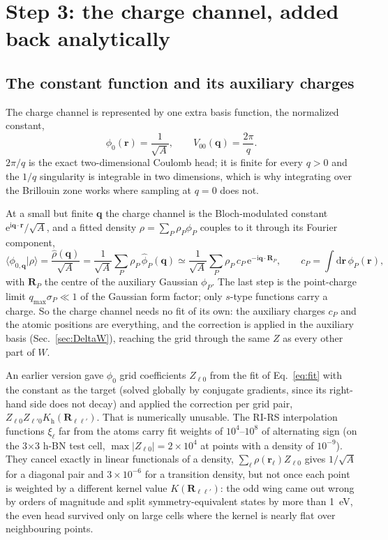 \documentclass[11pt,a4paper]{article}
\newcommand{\br}{\mathbf{r}}
\newcommand{\bR}{\mathbf{R}}
\newcommand{\bq}{\mathbf{q}}
\newcommand{\dd}{\mathrm{d}}
\newcommand{\ii}{\mathrm{i}}
\newcommand{\ee}{\mathrm{e}}
\newcommand{\head}{\mathrm{h}}
\begin{document}
\section{Step 3: the charge channel, added back analytically}
\label{sec:charge}

\subsection{The constant function and its auxiliary charges}
\label{sec:Zl0}

The charge channel is represented by one extra basis function, the normalized constant,
\begin{equation}
  \phi_0(\br) = \frac{1}{\sqrt A},\qquad V_{00}(\bq) = \frac{2\pi}{q}.
  \label{eq:phi0}
\end{equation}
$2\pi/q$ is the exact two-dimensional Coulomb head; it is finite for every $q>0$ and the
$1/q$ singularity is integrable in two dimensions, which is why integrating over the Brillouin
zone works where sampling at $q=0$ does not.

At a small but finite $\bq$ the charge channel is the Bloch-modulated constant
$\ee^{\ii\bq\cdot\br}/\sqrt A$, and a fitted density $\rho = \sum_P \rho_P\phi_P$ couples to
it through its Fourier component,
\begin{equation}
  \langle\phi_{0,\bq}|\rho\rangle = \frac{\hat\rho(\bq)}{\sqrt A}
  = \frac{1}{\sqrt A}\sum_P \rho_P\,\hat\phi_P(\bq)
  \simeq \frac{1}{\sqrt A}\sum_P \rho_P\, c_P\,\ee^{-\ii\bq\cdot\bR_P},\qquad
  c_P = \int\dd\br\,\phi_P(\br),
  \label{eq:Zl0}
\end{equation}
with $\bR_P$ the centre of the auxiliary Gaussian $\phi_P$. The last step is the point-charge
limit $q_\mathrm{max}\sigma_P\ll1$ of the Gaussian form factor; only $s$-type functions carry a
charge. So the charge channel needs no fit of its own: the auxiliary charges $c_P$ and the
atomic positions are everything, and the correction is applied in the auxiliary basis
(Sec.~\ref{sec:DeltaW}), reaching the grid through the same $Z$ as every other part of $W$.

An earlier version gave $\phi_0$ grid coefficients $Z_{\ell0}$ from the fit of
Eq.~\eqref{eq:fit} with the constant as the target (solved globally by conjugate gradients, since
its right-hand side does not decay) and applied the correction per grid pair,
$Z_{\ell0}Z_{\ell'0}K_\head(\bR_{\ell\ell'})$. That is numerically unusable. The RI-RS
interpolation functions $\xi_\ell$ far from the atoms carry fit weights of $10^4$--$10^8$ of
alternating sign (on the 3$\times$3 h-BN test cell, $\max|Z_{\ell0}| = 2\times10^4$ at points
with a density of $10^{-9}$). They cancel exactly in linear functionals of a density,
$\sum_\ell\rho(\br_\ell)Z_{\ell0}$ gives $1/\sqrt A$ for a diagonal pair and $3\times10^{-6}$
for a transition density, but not once each point is weighted by a different kernel value
$K(\bR_{\ell\ell'})$: the odd wing came out wrong by orders of magnitude and split
symmetry-equivalent states by more than 1~eV, the even head survived only on large cells where
the kernel is nearly flat over neighbouring points.
\end{document}
